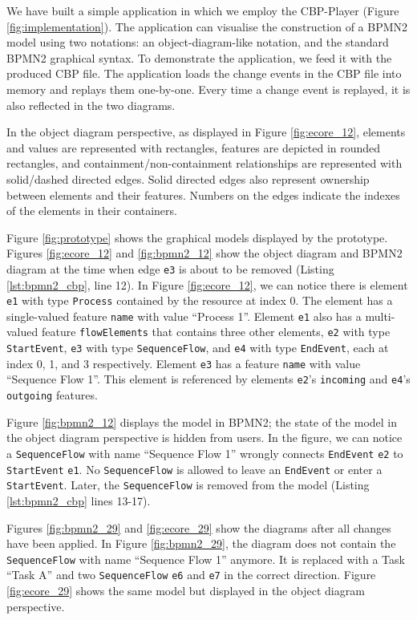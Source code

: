\documentclass[conference]{IEEEtran}
\begin{document}
We have built a simple application in which we employ the CBP-Player (Figure \ref{fig:implementation}). The application can visualise the construction of a BPMN2 model using two notations: an object-diagram-like notation, and the standard BPMN2 graphical syntax. 
To demonstrate the application, we feed it with the produced CBP file.
The application loads the change events in the CBP file into memory and replays them one-by-one. Every time a change event is replayed, it is also reflected in the two diagrams. 

In the object diagram perspective, as displayed in Figure \ref{fig:ecore_12}, 
elements and values are represented with rectangles, features are depicted in rounded rectangles, and containment/non-containment relationships are represented with solid/dashed directed edges. Solid directed edges also represent ownership between elements and their features. Numbers on the edges indicate the indexes of the elements in their containers. 

Figure \ref{fig:prototype} shows the graphical models displayed by the prototype. Figures \ref{fig:ecore_12} and \ref{fig:bpmn2_12} show the object diagram and BPMN2 diagram at the time when edge \texttt{e3} is about to be removed (Listing \ref{lst:bpmn2_cbp}, line 12). In Figure \ref{fig:ecore_12}, we can notice there is element \texttt{e1} with type \texttt{Process} contained by the resource at index 0. The element has a single-valued feature \texttt{name} with value ``Process 1''. Element \texttt{e1} also has a multi-valued feature \texttt{flowElements} that contains three other elements, \texttt{e2} with type \texttt{StartEvent}, \texttt{e3} with type \texttt{SequenceFlow}, and \texttt{e4} with type \texttt{EndEvent}, each at index 0, 1, and 3 respectively. Element \texttt{e3} has a feature \texttt{name} with value ``Sequence Flow 1''. This element is referenced by elements \texttt{e2}'s \texttt{incoming} and \texttt{e4}'s \texttt{outgoing} features.  

Figure \ref{fig:bpmn2_12} displays the model in BPMN2; the state of the model in the object diagram perspective is hidden from users. In the figure, we can notice a \texttt{SequenceFlow} with name ``Sequence Flow 1'' wrongly connects \texttt{EndEvent} \texttt{e2} to \texttt{StartEvent} \texttt{e1}. No \texttt{SequenceFlow} is allowed to leave an \texttt{EndEvent} or enter a \texttt{StartEvent}. Later, the \texttt{SequenceFlow} is removed from the model (Listing \ref{lst:bpmn2_cbp} lines 13-17).          

Figures \ref{fig:bpmn2_29} and \ref{fig:ecore_29} show the diagrams after all changes have been applied. In Figure \ref{fig:bpmn2_29}, the diagram does not contain the \texttt{SequenceFlow} with name ``Sequence Flow 1'' anymore. It is replaced with a Task ``Task A'' and two \texttt{SequenceFlow} \texttt{e6} and \texttt{e7} in the correct direction. Figure \ref{fig:ecore_29} shows the same model but displayed in the object diagram perspective. 
\end{document}
